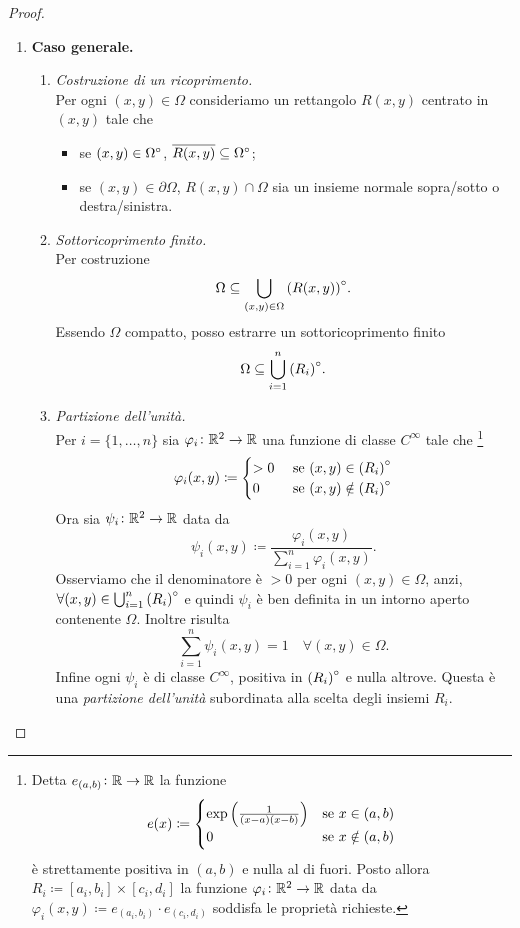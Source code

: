 \begin{proof}
\begin{enumerate}[label = \arabic*.]
		\item \textbf{Caso generale.}
		\begin{enumerate}[label = \emph{(\roman*)}]
			\item \emph{Costruzione di un ricoprimento.} \\
			Per ogni $ (x, y) \in \Omega $ consideriamo un rettangolo $ R(x, y) $ centrato in $ (x, y) $ tale che 
			\begin{itemize}
				\item se $ (x, y) \in {\Omega}^{\circ} $, $ \overline{R(x, y)} \subseteq {\Omega}^{\circ} $;
				\item se $ (x, y) \in \partial \Omega $, $ R(x, y) \cap \Omega $ sia un insieme normale sopra/sotto o destra/sinistra. \\
			\end{itemize}
			
			\item \emph{Sottoricoprimento finito.} \\
			Per costruzione 
			\[
				\Omega \subseteq \bigcup_{(x, y) \in \Omega} {(R(x, y))}^{\circ}.
			\]
			Essendo $ \Omega $ compatto, posso estrarre un sottoricoprimento finito 
			\[
				\Omega \subseteq \bigcup_{i = 1}^{n} {(R_i)}^{\circ}. \\
			\]
			
			\item \emph{Partizione dell'unità.} \\
			Per $ i = \{1, \ldots, n\} $ sia $ \varphi_i \colon \mathbb{R}^2 \to \mathbb{R} $ una funzione di classe $ C^{\infty} $ tale che 
			\footnote{%
			 Detta $ e_{(a, b)} \colon \mathbb{R} \to \mathbb{R} $ la funzione
			 \[
			 	e(x) \coloneqq 
			 	\begin{cases}
			 	\exp{\left(\frac{1}{(x - a)(x - b)}\right)} & \text{se $ x \in (a, b) $} \\
			 	0 & \text{se $ x \notin (a, b) $}
			 	\end{cases}
			 \]
			 è strettamente positiva in $ (a, b) $ e nulla al di fuori. Posto allora $ R_i \coloneqq [a_i, b_i] \times [c_i, d_i] $ la funzione $ \varphi_i \colon \mathbb{R}^2 \to \mathbb{R} $ data da $ \varphi_i(x, y) \coloneqq e_{(a_i, b_i)} \cdot e_{(c_i, d_i)} $ soddisfa le proprietà richieste. 
			}
			\[
				\varphi_i(x, y) \coloneqq 
				\begin{cases}
				 > 0 & \text{ se $ (x, y) \in {(R_i)}^{\circ} $} \\
				 0 & \text{ se $ (x, y) \notin {(R_i)}^{\circ} $}
				\end{cases}
			\]
			Ora sia $ \psi_i \colon \mathbb{R}^2 \to \mathbb{R} $ data da
			\[
				\psi_i(x, y) \coloneqq \frac{\varphi_i(x, y)}{\sum_{i = 1}^{n}\varphi_i(x, y)}.
			\]	
			Osserviamo che il denominatore è $ > 0 $ per ogni $ (x, y) \in \Omega $, anzi, $ \forall (x, y) \in \bigcup_{i = 1}^{n} {(R_i)}^{\circ} $ e quindi $ \psi_i $ è ben definita in un intorno aperto contenente $ \Omega $. Inoltre risulta 
			\[
				\sum_{i = 1}^{n} \psi_i(x, y) = 1 \quad \forall (x, y) \in \Omega.
			\]		
			Infine ogni $ \psi_i $ è di classe $ C^\infty $, positiva in $ {(R_i)}^{\circ} $ e nulla altrove. Questa è una \emph{partizione dell'unità} subordinata alla scelta degli insiemi $ R_i $. \\ 
			

\end{enumerate}
\end{enumerate}
\end{proof}
